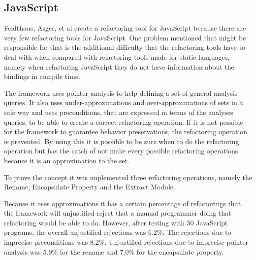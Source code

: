 \subsection{JavaScript}

Feldthaus, Asger, et al \cite{feldthaus2011tool} create a refactoring tool for JavaScript because there are very few refactoring tools for JavaScript. One problem mentioned that might be responsible for that is the additional difficulty that the refactoring tools have to deal with when compared with refactoring tools made for static languages, namely when refactoring JavaScript they do not have information about the bindings in compile time.



The framework uses pointer analysis to help defining a set of general analysis queries. It also uses under-approximations and over-approximations of sets in a safe way and uses preconditions, that are expressed in terms of the analyses queries, to be able to create a correct refactoring operation. 
If it is not possible for the framework to guarantee behavior preservations, the refactoring operation is prevented.
By using this it is possible to be sure when to do the refactoring operation but has the catch of not make every possible refactoring operations because it is an approximation to the set.

To prove the concept it was implemented three refactoring operations, namely the Rename, Encapsulate Property and the Extract Module.


Because it uses approximations it has a certain percentage of refactorings that the framework will unjustified reject that a manual programmer doing that refactoring would be able to do. 
However, after testing with 50 JavaScript programs, the overall unjustified rejections was 6.2\%. 
The rejections due to imprecise preconditions was 8.2\%.
Unjustified rejections due to imprecise pointer analysis was 5.9\% for the rename and 7.0\% for the encapsulate property. 
